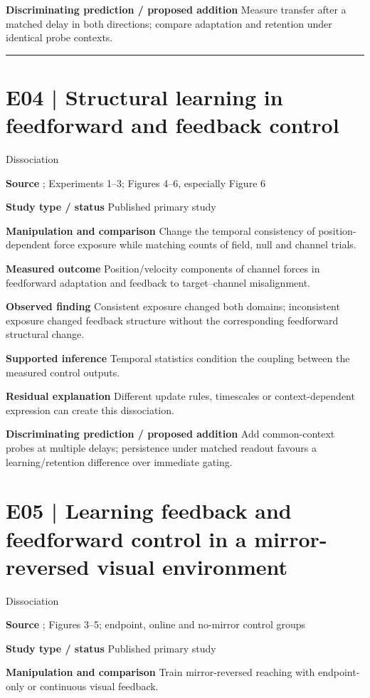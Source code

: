 \documentclass[11pt,a4paper]{article}
\begin{document}
\textbf{Discriminating prediction / proposed addition} Measure transfer after a matched delay in both directions; compare adaptation and retention under identical probe contexts.\par
\bigskip\hrule\medskip\section{E04 | Structural learning in feedforward and feedback control}
{\small\sffamily\color{navy} Dissociation}\par
\textbf{Source} \cite{yousif2012}; Experiments 1--3; Figures 4--6, especially Figure 6\par
\textbf{Study type / status} Published primary study\par
\textbf{Manipulation and comparison} Change the temporal consistency of position-dependent force exposure while matching counts of field, null and channel trials.\par
\textbf{Measured outcome} Position/velocity components of channel forces in feedforward adaptation and feedback to target--channel misalignment.\par
\textbf{Observed finding} Consistent exposure changed both domains; inconsistent exposure changed feedback structure without the corresponding feedforward structural change.\par
\textbf{Supported inference} Temporal statistics condition the coupling between the measured control outputs.\par
\textbf{Residual explanation} Different update rules, timescales or context-dependent expression can create this dissociation.\par
\textbf{Discriminating prediction / proposed addition} Add common-context probes at multiple delays; persistence under matched readout favours a learning/retention difference over immediate gating.\par
\clearpage\section{E05 | Learning feedback and feedforward control in a mirror-reversed visual environment}
{\small\sffamily\color{navy} Dissociation}\par
\textbf{Source} \cite{kasuga2015}; Figures 3--5; endpoint, online and no-mirror control groups\par
\textbf{Study type / status} Published primary study\par
\textbf{Manipulation and comparison} Train mirror-reversed reaching with endpoint-only or continuous visual feedback.\par
\end{document}
